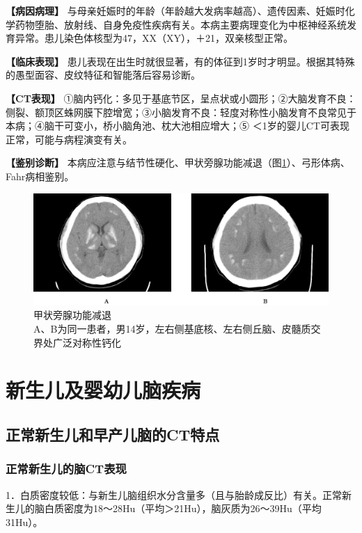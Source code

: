 \textbf{【病因病理】}
与母亲妊娠时的年龄（年龄越大发病率越高）、遗传因素、妊娠时化学药物堕胎、放射线、自身免疫性疾病有关。本病主要病理变化为中枢神经系统发育异常。患儿染色体核型为47，XX（XY），＋21，双亲核型正常。

\textbf{【临床表现】}
患儿表现在出生时就很显著，有的体征到1岁时才明显。根据其特殊的愚型面容、皮纹特征和智能落后容易诊断。

\textbf{【CT表现】}
①脑内钙化：多见于基底节区，呈点状或小圆形；②大脑发育不良：侧裂、额顶区蛛网膜下腔增宽；③小脑发育不良：轻度对称性小脑发育不良常见于本病；④脑干可变小，桥小脑角池、枕大池相应增大；⑤
＜1岁的婴儿CT可表现正常，可能与病程演变有关。

\textbf{【鉴别诊断】}
本病应注意与结节性硬化、甲状旁腺功能减退（图\ref{fig2-13}）、弓形体病、Fahr病相鉴别。

\begin{figure}[!htbp]
 {\centering
 \includegraphics[width=.7\textwidth,height=\textheight,keepaspectratio]{./images/Image00029.jpg}
 \captionsetup{justification=centering}
 \caption{甲状旁腺功能减退\\{\small  A、B为同一患者，男14岁，左右侧基底核、左右侧丘脑、皮髓质交界处广泛对称性钙化}}
 \label{fig2-13}}
  \end{figure} 



\section{新生儿及婴幼儿脑疾病}

\subsection{正常新生儿和早产儿脑的CT特点}

\subsubsection{正常新生儿的脑CT表现}

1．白质密度较低：与新生儿脑组织水分含量多（且与胎龄成反比）有关。正常新生儿的脑白质密度为18～28Hu（平均＞21Hu），脑灰质为26～39Hu（平均31Hu）。

